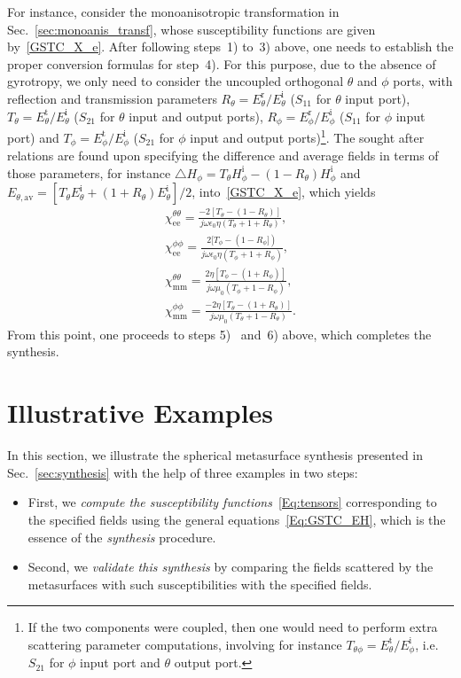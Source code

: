\documentclass[journal,transaction]{IEEEtran}
\begin{document}
For instance, consider the monoanisotropic transformation in Sec.~\ref{sec:monoanis_transf}, whose susceptibility functions are given by~\eqref{GSTC_X_e}. After following steps~1) to~3) above, one needs to establish the proper conversion formulas for step~4). For this purpose, due to the absence of gyrotropy, we only need to consider the uncoupled orthogonal $\theta$ and $\phi$ ports, with reflection and transmission parameters $R_\theta=E_\theta^\text{r}/E_\theta^\text{i}$ ($S_{11}$ for $\theta$ input port), $T_\theta=E_\theta^\text{t}/E_\theta^\text{i}$ ($S_{21}$ for $\theta$ input and output ports), $R_\phi=E_\phi^\text{r}/E_\phi^\text{i}$ ($S_{11}$ for $\phi$ input port) and $T_\phi=E_\phi^\text{t}/E_\phi^\text{i}$ ($S_{21}$ for $\phi$ input and output ports)\footnote{If the two components were coupled, then one would need to perform extra scattering parameter computations, involving for instance $T_{\theta\phi}=E_\theta^\text{t}/E_\phi^\text{i}$, i.e. $S_{21}$ for $\phi$ input port and $\theta$ output port.}. The sought after relations are found upon specifying the difference and average fields in terms of those parameters, for instance $\triangle H_\phi=T_\theta H_\phi^\text{i}-(1-R_\theta)H_\phi^\text{i}$ and  $E_{\theta,\text{av}}=[T_\theta E_\theta^\text{i}+(1+R_\theta)E_\theta^\text{i}]/2$, into~\eqref{GSTC_X_e}, which yields
%
\begin{subequations}\label{Eq:chisacteering}
\begin{align}
\chi_\text{ee}^{\theta\theta}=\frac{-2[T_\theta-(1-R_\theta)]}{j\omega\epsilon_0\eta(T_\theta+1+R_\theta)},\\
\chi_\text{ee}^{\phi\phi}=\frac{2[T_\phi-(1-R_\phi])}{j\omega\epsilon_0\eta(T_\phi+1+R_\phi)},\\
\chi_\text{mm}^{\theta\theta}=\frac{2\eta[T_\phi-(1+R_\phi)]}{j\omega\mu_0(T_\phi+1-R_\phi)},\\
\chi_\text{mm}^{\phi\phi}=\frac{-2\eta[T_\theta-(1+R_\theta)]}{j\omega\mu_0(T_\theta+1-R_\theta)}.
\end{align}
\end{subequations}
%
From this point, one proceeds to steps 5)~ and~6) above, which completes the synthesis.

\section{Illustrative Examples}\label{sec:Ill_ex}

In this section, we illustrate the spherical metasurface synthesis presented in Sec.~\ref{sec:synthesis} with the help of three examples in two steps:
%
\begin{itemize}
  \item First, we \emph{compute the susceptibility functions}~\eqref{Eq:tensors} corresponding to the specified fields using the general equations~\eqref{Eq:GSTC_EH}, which is the essence of the \emph{synthesis} procedure.
  \item Second, we \emph{validate this synthesis} by comparing the fields scattered by the metasurfaces with such susceptibilities with the specified fields.
\end{itemize}
\end{document}
